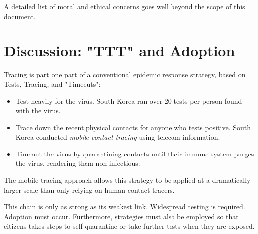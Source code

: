 \documentclass{article}
\begin{document}
A detailed list of moral and ethical concerns goes well beyond the scope of this document. 

\section{Discussion: "TTT" and Adoption}
Tracing is part one part of a conventional epidemic response strategy, based on Tests, Tracing, and "Timeouts": 
\begin{itemize}
\item Test heavily for the virus.  South Korea ran over 20 tests per person found with the virus. 
\item Trace down the recent physical contacts for anyone who tests positive.  South Korea conducted \emph{mobile contact tracing} using telecom information.
\item Timeout the virus by quarantining contacts until their immune system purges the virus, rendering them non-infectious.
\end{itemize}
The mobile tracing approach allows this strategy to be applied at a dramatically larger scale than only relying on human contact tracers.  

This chain is only as strong as its weakest link.  Widespread testing is required.  Adoption must occur. Furthermore, strategies must also be employed so that citizens takes steps to self-quarantine or take further tests when they are exposed.
\end{document}
